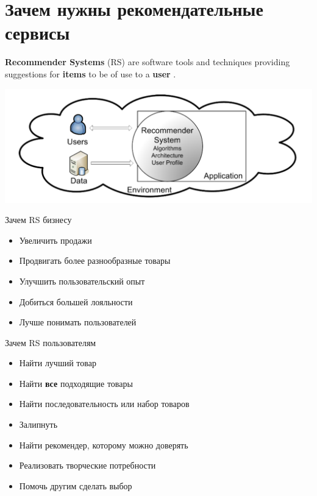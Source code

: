 \documentclass[11pt,aspectratio=169]{beamer}
\begin{document}
\section{Зачем нужны рекомендательные сервисы}

\begin{frame}{}

\vfill
\begin{tcolorbox}[colback=info!5,colframe=info!80,title=]
{\bf Recommender Systems} (RS) are software tools and techniques providing suggestions for {\bf items} to be of use to a {\bf user} \cite{RSHB}.
\end{tcolorbox}
\vfill
\begin{center}
\includegraphics[scale=0.3]{images/overall.png}
\end{center}

\end{frame}

\begin{frame}{Зачем RS бизнесу}

\begin{itemize}[<+->]
\item Увеличить продажи
\item Продвигать более разнообразные товары
\item Улучшить пользовательский опыт
\item Добиться большей лояльности
\item Лучше понимать пользователей
\end{itemize}

\end{frame}

\begin{frame}{Зачем RS пользователям}

\begin{itemize}[<+->]
\item Найти лучший товар
\item Найти {\bf все} подходящие товары
\item Найти последовательность или набор товаров
\item Залипнуть
\item Найти рекомендер, которому можно доверять
\item Реализовать творческие потребности
\item Помочь другим сделать выбор
\end{itemize}

\end{frame}
\end{document}
